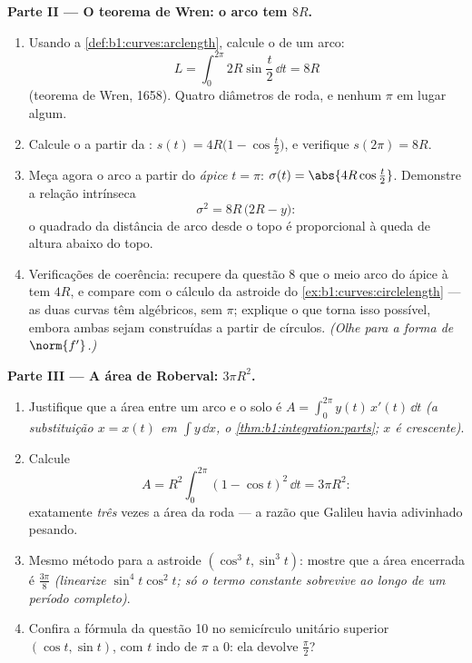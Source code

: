 \begin{problem}
\medskip
\noindent\textbf{Parte II --- O teorema de Wren: o arco tem
 $8R$.}
\begin{enumerate}[resume]
  \item Usando a \cref{def:b1:curves:arclength}, calcule o  de um arco:
        \[
        L = \int_0^{2\pi} 2R\sin\frac t2\,\dd t = 8R
        \]
        (teorema de Wren, 1658). Quatro diâmetros de roda, e nenhum
        $\pi$ em lugar algum.
  \item Calcule o  a partir da : $s(t) =
        4R\bigl(1 - \cos\frac t2\bigr)$, e
        verifique $s(2\pi) =
        8R$.
  \item Meça agora o arco a partir do \emph{ápice} $t = \pi$: $\sigma(t) = \abs{4R\cos\frac t2}$.
        Demonstre a relação intrínseca
        \[
        \sigma^2 = 8R\,\bigl(2R - y\bigr) :
        \]
        o quadrado da distância de arco desde o topo é proporcional à
        queda de altura abaixo do topo.
  \item Verificações de coerência: recupere da questão 8 que o meio
        arco do ápice à  tem  $4R$, e compare com o
        cálculo da astroide do \cref{ex:b1:curves:circlelength} --- as duas curvas têm
         algébricos, sem $\pi$; explique o que torna isso
        possível, embora ambas sejam construídas a partir de
        círculos. \emph{(Olhe para a forma de $\norm{f'}$.)}
\end{enumerate}

\medskip
\noindent\textbf{Parte III --- A área de Roberval: $3\pi R^2$.}
\begin{enumerate}[resume]
  \item Justifique que a área entre um arco e o solo é $A = \int_0^{2\pi} y(t)\,x'(t)\,\dd t$ \emph{(a
        substituição $x = x(t)$ em $\int y\,\dd x$, o \cref{thm:b1:integration:parts}; $x$ é crescente)}.
  \item Calcule
        \[
        A = R^2\int_0^{2\pi}(1 - \cos t)^2\,\dd t = 3\pi R^2 :
        \]
        exatamente \emph{três} vezes a área da roda --- a razão que
        Galileu havia adivinhado pesando.
  \item Mesmo método para a astroide $(\cos^3t, \sin^3t)$: mostre que a área
        encerrada é $\frac{3\pi}8$ \emph{(linearize $\sin^4 t\cos^2 t$; só o termo
        constante sobrevive ao longo de um período completo)}.
  \item Confira a fórmula da questão 10 no semicírculo unitário
        superior $(\cos t, \sin t)$, com $t$ indo de $\pi$ a $0$: ela devolve
        $\frac\pi2$?
\end{enumerate}


\end{problem}
